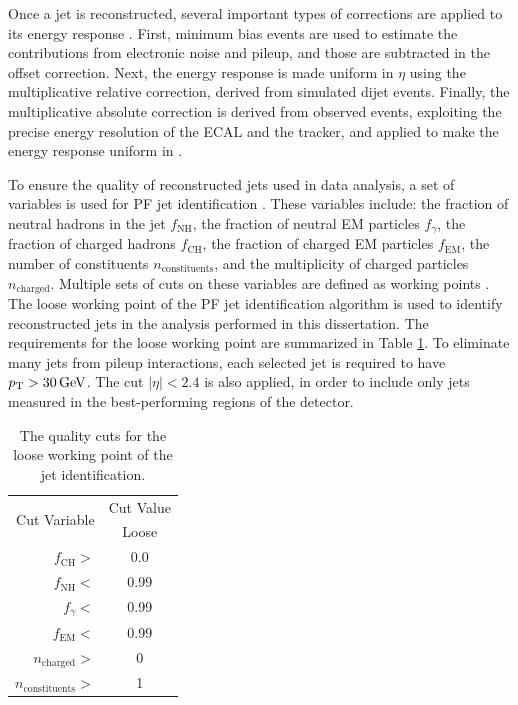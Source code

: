 Once a jet is reconstructed, several important types of corrections are applied to its energy response \cite{CMS-JEC}. First, minimum bias events are used to estimate the contributions from electronic noise and pileup, and those are subtracted in the offset correction. Next, the energy response is made uniform in $\eta$ using the multiplicative relative correction, derived from simulated dijet events. Finally, the multiplicative absolute correction is derived from observed \GZJ events, exploiting the precise energy resolution of the ECAL and the tracker, and applied to make the energy response uniform in \pt.

To ensure the quality of reconstructed jets used in data analysis, a set of variables is used for PF jet identification \cite{CMS-AN-2010-003}. These variables include: the fraction of neutral hadrons in the jet $f_{\text{NH}}$, the fraction of neutral EM particles $f_{\gamma}$, the fraction of charged hadrons $f_{\text{CH}}$, the fraction of charged EM particles $f_{\text{EM}}$, the number of constituents $n_{\text{constituents}}$, and the multiplicity of charged particles $n_{\text{charged}}$. Multiple sets of cuts on these variables are defined as working points \cite{PFJetID}. The loose working point of the PF jet identification algorithm is used to identify reconstructed jets in the analysis performed in this dissertation. The requirements for the loose working point are summarized in Table \ref{tab:jetWP}. To eliminate many jets from pileup interactions, each selected jet is required to have $p_{\mathrm{T}}>30\,\text{Ge\hspace{-.08em}V}$. The cut $|\eta|<2.4$ is also applied, in order to include only jets measured in the best-performing regions of the detector.

\begin{table}[htb]
  \begin{center}
    \begin{tabular}{|r|c|}
      \hline
      \multirow{2}{*}{Cut Variable} & Cut Value \\
      \cline{2-2}
                                    & Loose \\
      \hline
      $f_{\text{CH}}>$              & 0.0 \\
      $f_{\text{NH}}<$              & 0.99 \\
      $f_{\gamma}<$                 & 0.99 \\
      $f_{\text{EM}}<$              & 0.99 \\
      $n_{\text{charged}}>$         & 0 \\
      $n_{\text{constituents}}>$    & 1 \\
      \hline
    \end{tabular}
    \caption{The quality cuts for the loose working point of the jet identification. }
    \label{tab:jetWP}
  \end{center}
\end{table}

